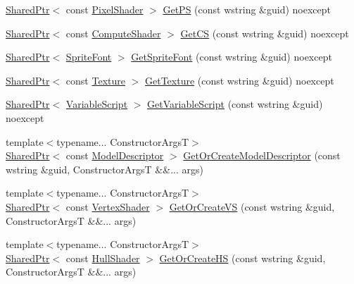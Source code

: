 \begin{DoxyCompactItemize}
\item 
\hyperlink{namespacemage_a1e01ae66713838a7a67d30e44c67703e}{Shared\+Ptr}$<$ const \hyperlink{namespacemage_a27ecaf266420ee7a494d64edc0757129}{Pixel\+Shader} $>$ \hyperlink{classmage_1_1_resource_manager_acf32120f85d46e82d2ddcfc8fe66bea7}{Get\+PS} (const wstring \&guid) noexcept
\item 
\hyperlink{namespacemage_a1e01ae66713838a7a67d30e44c67703e}{Shared\+Ptr}$<$ const \hyperlink{namespacemage_ae040329401484b076f0cd1a7c43d19c9}{Compute\+Shader} $>$ \hyperlink{classmage_1_1_resource_manager_a87967af3f0896373023c858db4a8307b}{Get\+CS} (const wstring \&guid) noexcept
\item 
\hyperlink{namespacemage_a1e01ae66713838a7a67d30e44c67703e}{Shared\+Ptr}$<$ \hyperlink{classmage_1_1_sprite_font}{Sprite\+Font} $>$ \hyperlink{classmage_1_1_resource_manager_a6ad7dc799e076da85d4638380b1838ff}{Get\+Sprite\+Font} (const wstring \&guid) noexcept
\item 
\hyperlink{namespacemage_a1e01ae66713838a7a67d30e44c67703e}{Shared\+Ptr}$<$ const \hyperlink{classmage_1_1_texture}{Texture} $>$ \hyperlink{classmage_1_1_resource_manager_a2e2f86c3ab9c91900e8f10b94cafb06a}{Get\+Texture} (const wstring \&guid) noexcept
\item 
\hyperlink{namespacemage_a1e01ae66713838a7a67d30e44c67703e}{Shared\+Ptr}$<$ \hyperlink{classmage_1_1_variable_script}{Variable\+Script} $>$ \hyperlink{classmage_1_1_resource_manager_ac54eb6fd61322a66bdc704a88eca192d}{Get\+Variable\+Script} (const wstring \&guid) noexcept
\item 
{\footnotesize template$<$typename... Constructor\+ArgsT$>$ }\\\hyperlink{namespacemage_a1e01ae66713838a7a67d30e44c67703e}{Shared\+Ptr}$<$ const \hyperlink{classmage_1_1_model_descriptor}{Model\+Descriptor} $>$ \hyperlink{classmage_1_1_resource_manager_a02e823df69a151f8a2642bd3ff3140c2}{Get\+Or\+Create\+Model\+Descriptor} (const wstring \&guid, Constructor\+ArgsT \&\&... args)
\item 
{\footnotesize template$<$typename... Constructor\+ArgsT$>$ }\\\hyperlink{namespacemage_a1e01ae66713838a7a67d30e44c67703e}{Shared\+Ptr}$<$ const \hyperlink{classmage_1_1_vertex_shader}{Vertex\+Shader} $>$ \hyperlink{classmage_1_1_resource_manager_ab1a1a4d7e577707b6edf0e068d6c1bff}{Get\+Or\+Create\+VS} (const wstring \&guid, Constructor\+ArgsT \&\&... args)
\item 
{\footnotesize template$<$typename... Constructor\+ArgsT$>$ }\\\hyperlink{namespacemage_a1e01ae66713838a7a67d30e44c67703e}{Shared\+Ptr}$<$ const \hyperlink{namespacemage_a964e5e384b0e55ac900c819da48b6000}{Hull\+Shader} $>$ \hyperlink{classmage_1_1_resource_manager_a7cfe4718a6efd82947368133335bcb47}{Get\+Or\+Create\+HS} (const wstring \&guid, Constructor\+ArgsT \&\&... args)

\end{DoxyCompactItemize}
